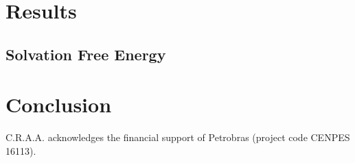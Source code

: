 \documentclass[
    journal=jctcce,
    layout=twocolumn
]{achemso}
\begin{document}
\section{Results}

\subsection{Solvation Free Energy}
\label{sec:solvation free energy}


\section{Conclusion}


\begin{acknowledgement}

C.R.A.A. acknowledges the financial support of Petrobras (project code CENPES 16113).

\end{acknowledgement}


\end{document}
